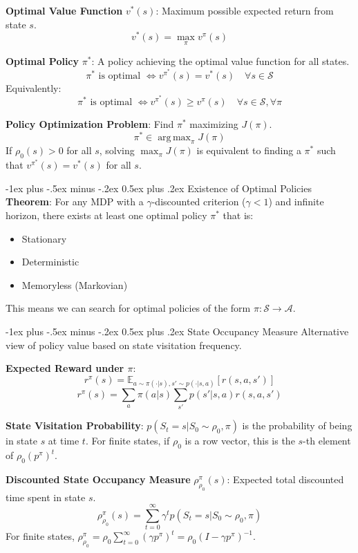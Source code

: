 \documentclass[10pt,landscape]{article}
\makeatletter
\DeclareMathOperator*{\argmax}{arg\,max}
\renewcommand{\section}{\@startsection{section}{1}{0mm}%
                                {-1ex plus -.5ex minus -.2ex}%
                                {0.5ex plus .2ex}%
                                {\normalfont\large\bfseries}}
\renewcommand{\subsection}{\@startsection{subsection}{2}{0mm}%
                                {-1ex plus -.5ex minus -.2ex}%
                                {0.5ex plus .2ex}%
                                {\normalfont\normalsize\bfseries}}
\makeatother
\begin{document}
\begin{multicols}{3}
    \textbf{Optimal Value Function} $v^*(s)$: Maximum possible expected return from state $s$.
    $$ v^*(s) = \max_\pi v^\pi(s) $$

    \textbf{Optimal Policy} $\pi^*$: A policy achieving the optimal value function for all states.
    $$ \pi^* \text{ is optimal } \iff v^{\pi^*}(s) = v^*(s) \quad \forall s \in \mathcal{S} $$
    Equivalently:
    $$ \pi^* \text{ is optimal } \iff v^{\pi^*}(s) \ge v^\pi(s) \quad \forall s \in \mathcal{S}, \forall \pi $$

    \textbf{Policy Optimization Problem}: Find $\pi^*$ maximizing $J(\pi)$.
    $$ \pi^* \in \argmax_\pi J(\pi) $$
    If $\rho_0(s) > 0$ for all $s$, solving $\max_\pi J(\pi)$ is equivalent to finding a $\pi^*$ such that $v^{\pi^*}(s) = v^*(s)$ for all $s$.

    \subsection{Existence of Optimal Policies}
    \textbf{Theorem}: For any MDP with a $\gamma$-discounted criterion ($\gamma < 1$) and infinite horizon, there exists at least one optimal policy $\pi^*$ that is:
    \begin{itemize}[label={--},leftmargin=4mm, itemsep=-.4mm]
        \item Stationary
        \item Deterministic
        \item Memoryless (Markovian)
    \end{itemize}
    This means we can search for optimal policies of the form $\pi: \mathcal{S} \to \mathcal{A}$.

    \section{State Occupancy Measure}
    Alternative view of policy value based on state visitation frequency.

    \textbf{Expected Reward under $\pi$}:
    $$ r^\pi(s) = \mathbb{E}_{a \sim \pi(\cdot|s), s' \sim p(\cdot|s,a)} [r(s,a,s')] $$
    $$ r^\pi(s) = \sum_{a} \pi(a|s) \sum_{s'} p(s'|s,a) r(s,a,s') $$

    \textbf{State Visitation Probability}:
    $p(S_t=s | S_0 \sim \rho_0, \pi)$ is the probability of being in state $s$ at time $t$. For finite states, if $\rho_0$ is a row vector, this is the $s$-th element of $\rho_0 (p^\pi)^t$.

    \textbf{Discounted State Occupancy Measure} $\rho^\pi_{\rho_0}(s)$: Expected total discounted time spent in state $s$.
    $$ \rho^\pi_{\rho_0}(s) = \sum_{t=0}^\infty \gamma^t p(S_t=s | S_0 \sim \rho_0, \pi) $$
    For finite states, $\rho^\pi_{\rho_0} = \rho_0 \sum_{t=0}^\infty (\gamma p^\pi)^t = \rho_0 (I - \gamma p^\pi)^{-1}$.


\end{multicols}
\end{document}
